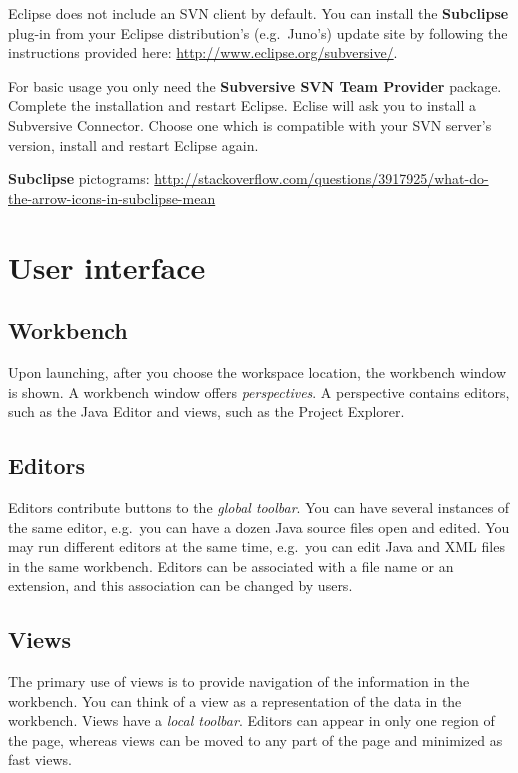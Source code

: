 \documentclass[]{report}
\begin{document}
Eclipse does not include an SVN client by default. You can install the
\textbf{Subclipse} plug-in from your Eclipse distribution's
(e.g.~Juno's) update site by following the instructions provided here:
\url{http://www.eclipse.org/subversive/}.

For basic usage you only need the \textbf{Subversive SVN Team Provider}
package. Complete the installation and restart Eclipse. Eclise will ask
you to install a Subversive Connector. Choose one which is compatible
with your SVN server's version, install and restart Eclipse again.

\textbf{Subclipse} pictograms:
\url{http://stackoverflow.com/questions/3917925/what-do-the-arrow-icons-in-subclipse-mean}

\section{User interface}

\subsection{Workbench}

Upon launching, after you choose the workspace location, the workbench
window is shown. A workbench window offers \emph{perspectives}. A
perspective contains editors, such as the Java Editor and views, such as
the Project Explorer.

\subsection{Editors}

Editors contribute buttons to the \emph{global toolbar}. You can have
several instances of the same editor, e.g.~you can have a dozen Java
source files open and edited. You may run different editors at the same
time, e.g.~you can edit Java and XML files in the same workbench.
Editors can be associated with a file name or an extension, and this
association can be changed by users.

\subsection{Views}

The primary use of views is to provide navigation of the information in
the workbench. You can think of a view as a representation of the data
in the workbench. Views have a \emph{local toolbar}. Editors can appear
in only one region of the page, whereas views can be moved to any part
of the page and minimized as fast views.
\end{document}
